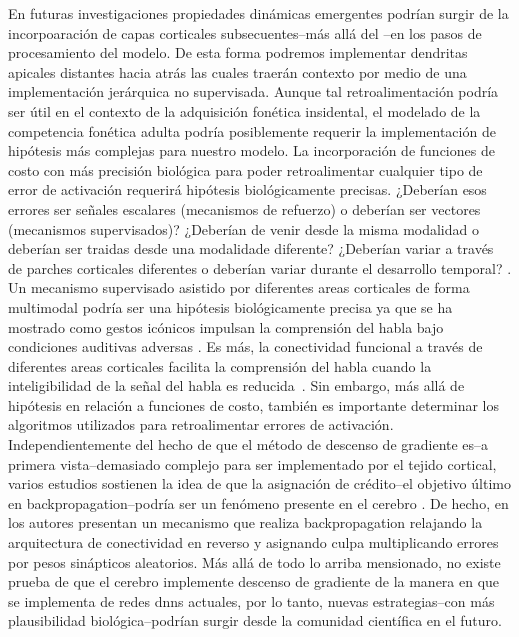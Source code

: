 {En futuras investigaciones propiedades dinámicas emergentes podrían surgir de la incorpoaración de capas corticales subsecuentes--más allá del --en los pasos de procesamiento del modelo. De esta forma podremos implementar dendritas apicales distantes hacia atrás las cuales traerán contexto por medio de una implementación jerárquica no supervisada.
Aunque tal retroalimentación podría ser útil en el contexto de la adquisición fonética insidental, el modelado de la competencia fonética adulta podría posiblemente requerir la implementación de hipótesis más complejas para nuestro modelo. La incorporación de funciones de costo con más precisión biológica para poder retroalimentar cualquier tipo de error de activación requerirá hipótesis biológicamente precisas. ¿Deberían esos errores ser señales escalares (mecanismos de refuerzo) o deberían ser vectores (mecanismos supervisados)? ¿Deberían de venir desde la misma modalidad o deberían ser traidas desde una modalidade diferente? ¿Deberían variar a través de parches corticales diferentes o deberían variar durante el desarrollo temporal? \cite{10.3389/fncom.2016.00094}.
Un mecanismo supervisado asistido por diferentes areas corticales de forma multimodal podría ser una hipótesis biológicamente precisa ya que se ha mostrado como gestos icónicos impulsan la comprensión del habla bajo condiciones auditivas adversas \cite{HOLLE2010875}.
Es más, la conectividad funcional a través de diferentes areas corticales facilita la comprensión del habla cuando la inteligibilidad de la señal del habla es reducida~\cite{Obleser2283}. Sin embargo, más allá de hipótesis en relación a funciones de costo, también es importante determinar los algoritmos utilizados para retroalimentar errores de activación. Independientemente del hecho de que el método de descenso de gradiente es--a primera vista--demasiado complejo para ser implementado por el tejido cortical, varios estudios sostienen la idea de que la asignación de crédito--el objetivo último en backpropagation--podría ser un fenómeno presente en el cerebro \cite{Guerguiev2017TowardsDL}. De hecho, en \cite{Lillicrap_2016} los autores presentan un mecanismo que realiza backpropagation relajando la arquitectura de conectividad en reverso y asignando culpa multiplicando errores por pesos sinápticos aleatorios.
Más allá de todo lo arriba mensionado, no existe prueba de que el cerebro implemente descenso de gradiente de la manera en que se implementa de redes \glspl{dnn} actuales, por lo tanto, nuevas estrategias--con más plausibilidad biológica--podrían surgir desde la comunidad científica en el futuro.

}
